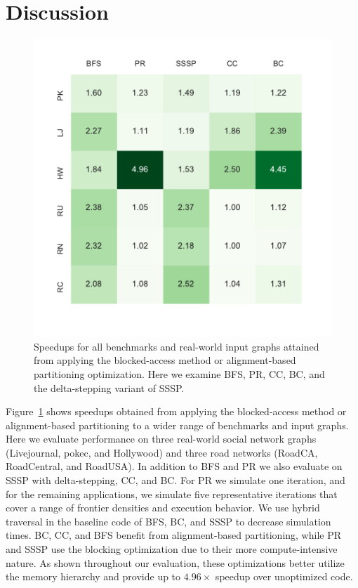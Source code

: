 \section{Discussion}\label{sec:discussion}


\begin{figure}[t!]
    \centering
    \includegraphics[scale=0.6]{graphit-figures/heatmap.pdf}
    \caption{Speedups for all benchmarks and real-world input graphs attained from applying the blocked-access method or alignment-based partitioning optimization. Here we examine BFS, PR, CC, BC, and the delta-stepping variant of SSSP.}
    \label{pap:generals:sec:eval:fig:heatmap}
\end{figure}

Figure~\ref{pap:generals:sec:eval:fig:heatmap} shows speedups obtained from applying the blocked-access method or alignment-based partitioning to a wider range of benchmarks and input graphs.
Here we evaluate performance on three real-world social network graphs (Livejournal, pokec, and Hollywood) and three road networks (RoadCA, RoadCentral, and RoadUSA).
In addition to BFS and PR we also evaluate on SSSP with delta-stepping, CC, and BC.
For PR we simulate one iteration, and for the remaining applications, we simulate five representative iterations that cover a range of frontier densities and execution behavior.
We use hybrid traversal in the baseline code of BFS, BC, and SSSP to decrease simulation times.
BC, CC, and BFS benefit from alignment-based partitioning, while PR and SSSP use the blocking optimization due to their more compute-intensive nature.
As shown throughout our evaluation, these optimizations better utilize the memory hierarchy and provide up to $4.96\times$ speedup over unoptimized code.

